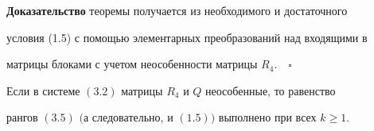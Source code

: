  


{\bf Доказательство} теоремы получается из необходимого и достаточного 


условия (1.5) с помощью элементарных преобразований над входящими в 


матрицы блоками с учетом неособенности матрицы $R_4$.$\quad\square$ 


 


\begin{thms} 


Если в системе $(3.2)$ матрицы $R_4$ и $Q$ неособенные, то равенство 


рангов $(3.5)$ $($а следовательно, и $(1.5))$ выполнено при всех $k\ge1$. 


\end{thms} 


 


 


